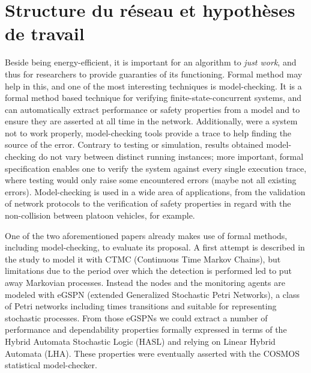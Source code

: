 \chapter{Structure du réseau et hypothèses de travail}\label{chap:st}

\renewcommand\chapterpath{Main/Structure}
\renewcommand\chapterfig{Main/Structure/Figures}



\bigskip
{}


Beside being energy-efficient, it is important for an algorithm to \emph{just work}, and thus for researchers to provide guaranties of its functioning.
Formal method may help in this, and one of the most interesting techniques is model-checking.
It is a formal method based technique for verifying finite-state-concurrent systems, and can automatically extract performance or safety properties from a model and to ensure they are asserted at all time in the network.
Additionally, were a system not to work properly, model-checking tools provide a trace to help finding the source of the error.
Contrary to testing or simulation, results obtained \via model-checking do not vary between distinct running instances; more important, formal specification enables one to verify the system against every single execution trace, where testing would only raise some encountered errors (maybe not all existing errors).
Model-checking is used in a wide area of applications, from the validation of network protocols to the verification of safety properties in regard with the non-collision between platoon vehicles\cite{E-ZCGGK12}, for example.

One of the two aforementioned papers already makes use of formal methods, including model-checking, to evaluate its proposal\cite{BMM13}.
A first attempt is described in the study to model it with CTMC (Continuous Time Markov Chains), but limitations due to the period over which the detection is performed led to put away Markovian processes.
Instead the nodes and the monitoring agents are modeled with eGSPN (extended Generalized Stochastic Petri Networks), a class of Petri networks including times transitions and suitable for representing stochastic processes.
From those eGSPNs we could extract a number of performance and dependability properties formally expressed in terms of the Hybrid Automata Stochastic Logic (HASL\cite{BDDHP11hasl}) and relying on Linear Hybrid Automata (LHA).
These properties were eventually asserted with the COSMOS statistical model-checker\cite{BDDHP11cosmos}.

